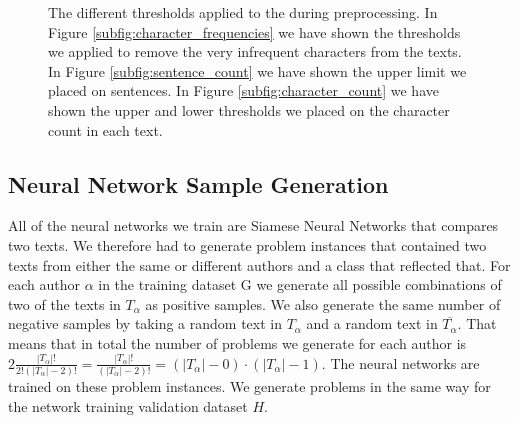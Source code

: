 \begin{figure}[htb]
\begin{minipage}{.5\linewidth}
{        }
    \end{minipage}\par\medskip
    \centering

    \caption{The different thresholds applied to the during preprocessing. In
        Figure \ref{subfig:character_frequencies} we have shown the thresholds
        we applied to remove the very infrequent characters from the texts. In
        Figure \ref{subfig:sentence_count} we have shown the upper limit we
        placed on sentences. In Figure \ref{subfig:character_count} we have
        shown the upper and lower thresholds we placed on the character count in
        each text.
    }
    \label{fig:cutoff_thresholds}
\end{figure}


\subsection{Neural Network Sample Generation}

All of the neural networks we train are Siamese Neural Networks that
compares two texts. We therefore had to generate problem instances that
contained two texts from either the same or different authors and a class
that reflected that. For each author $\alpha$ in the training dataset \gls{G}
we generate all possible combinations of two of the texts in $T_\alpha$ as
positive samples. We also generate the same number of negative samples by
taking a random text in $T_\alpha$ and a random text in $\overline{T_\alpha}$.
That means that in total the number of problems we generate for each
author is $2\frac{\left|T_\alpha\right|!}{2!(\left|T_\alpha\right|-2)!}
= \frac{\left|T_\alpha\right|!}{(\left|T_\alpha\right|-2)!} =
(\left|T_\alpha\right| - 0) \cdot (\left|T_\alpha\right| - 1) $. The neural
networks are trained on these problem instances. We generate problems in the
same way for the network training validation dataset $H$.
